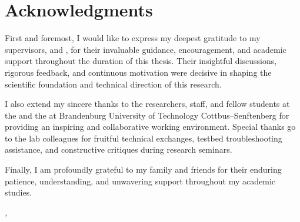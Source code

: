 \vspace{0.4cm}

\chapter*{Acknowledgments}

First and foremost, I would like to express my deepest gratitude to my supervisors, \textbf{\PrimarySupervisor} and \textbf{\SecondarySupervisor}, for their invaluable guidance, encouragement, and academic support throughout the duration of this thesis. Their insightful discussions, rigorous feedback, and continuous motivation were decisive in shaping the scientific foundation and technical direction of this research.

I also extend my sincere thanks to the researchers, staff, and fellow students at the \textbf{\ChairName} and the \textbf{\InstituteName} at Brandenburg University of Technology Cottbus--Senftenberg for providing an inspiring and collaborative working environment. Special thanks go to the lab colleagues for fruitful technical exchanges, testbed troubleshooting assistance, and constructive critiques during research seminars.

Finally, I am profoundly grateful to my family and friends for their enduring patience, understanding, and unwavering support throughout my academic studies.

\vspace{1.5cm}
\noindent
\textit{\SubmissionCity, \SubmissionDate} \hfill \textbf{\AuthorName}
